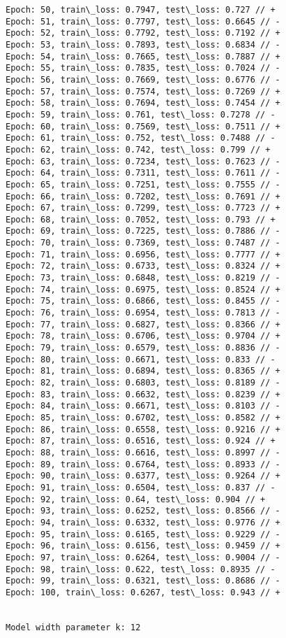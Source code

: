 \documentclass[11pt]{article}
\begin{document}
\begin{Verbatim}[commandchars=\\\{\}]
Epoch: 50, train\_loss: 0.7947, test\_loss: 0.727 // +
Epoch: 51, train\_loss: 0.7797, test\_loss: 0.6645 // -
Epoch: 52, train\_loss: 0.7792, test\_loss: 0.7192 // +
Epoch: 53, train\_loss: 0.7893, test\_loss: 0.6834 // -
Epoch: 54, train\_loss: 0.7665, test\_loss: 0.7887 // +
Epoch: 55, train\_loss: 0.7835, test\_loss: 0.7024 // -
Epoch: 56, train\_loss: 0.7669, test\_loss: 0.6776 // -
Epoch: 57, train\_loss: 0.7574, test\_loss: 0.7269 // +
Epoch: 58, train\_loss: 0.7694, test\_loss: 0.7454 // +
Epoch: 59, train\_loss: 0.761, test\_loss: 0.7278 // -
Epoch: 60, train\_loss: 0.7569, test\_loss: 0.7511 // +
Epoch: 61, train\_loss: 0.752, test\_loss: 0.7488 // -
Epoch: 62, train\_loss: 0.742, test\_loss: 0.799 // +
Epoch: 63, train\_loss: 0.7234, test\_loss: 0.7623 // -
Epoch: 64, train\_loss: 0.7311, test\_loss: 0.7611 // -
Epoch: 65, train\_loss: 0.7251, test\_loss: 0.7555 // -
Epoch: 66, train\_loss: 0.7202, test\_loss: 0.7691 // +
Epoch: 67, train\_loss: 0.7299, test\_loss: 0.7723 // +
Epoch: 68, train\_loss: 0.7052, test\_loss: 0.793 // +
Epoch: 69, train\_loss: 0.7225, test\_loss: 0.7886 // -
Epoch: 70, train\_loss: 0.7369, test\_loss: 0.7487 // -
Epoch: 71, train\_loss: 0.6956, test\_loss: 0.7777 // +
Epoch: 72, train\_loss: 0.6733, test\_loss: 0.8324 // +
Epoch: 73, train\_loss: 0.6848, test\_loss: 0.8219 // -
Epoch: 74, train\_loss: 0.6975, test\_loss: 0.8524 // +
Epoch: 75, train\_loss: 0.6866, test\_loss: 0.8455 // -
Epoch: 76, train\_loss: 0.6954, test\_loss: 0.7813 // -
Epoch: 77, train\_loss: 0.6827, test\_loss: 0.8366 // +
Epoch: 78, train\_loss: 0.6706, test\_loss: 0.9704 // +
Epoch: 79, train\_loss: 0.6579, test\_loss: 0.8836 // -
Epoch: 80, train\_loss: 0.6671, test\_loss: 0.833 // -
Epoch: 81, train\_loss: 0.6894, test\_loss: 0.8365 // +
Epoch: 82, train\_loss: 0.6803, test\_loss: 0.8189 // -
Epoch: 83, train\_loss: 0.6632, test\_loss: 0.8239 // +
Epoch: 84, train\_loss: 0.6671, test\_loss: 0.8103 // -
Epoch: 85, train\_loss: 0.6702, test\_loss: 0.8582 // +
Epoch: 86, train\_loss: 0.6558, test\_loss: 0.9216 // +
Epoch: 87, train\_loss: 0.6516, test\_loss: 0.924 // +
Epoch: 88, train\_loss: 0.6616, test\_loss: 0.8997 // -
Epoch: 89, train\_loss: 0.6764, test\_loss: 0.8933 // -
Epoch: 90, train\_loss: 0.6377, test\_loss: 0.9264 // +
Epoch: 91, train\_loss: 0.6504, test\_loss: 0.837 // -
Epoch: 92, train\_loss: 0.64, test\_loss: 0.904 // +
Epoch: 93, train\_loss: 0.6252, test\_loss: 0.8566 // -
Epoch: 94, train\_loss: 0.6332, test\_loss: 0.9776 // +
Epoch: 95, train\_loss: 0.6165, test\_loss: 0.9229 // -
Epoch: 96, train\_loss: 0.6156, test\_loss: 0.9459 // +
Epoch: 97, train\_loss: 0.6264, test\_loss: 0.9004 // -
Epoch: 98, train\_loss: 0.622, test\_loss: 0.8935 // -
Epoch: 99, train\_loss: 0.6321, test\_loss: 0.8686 // -
Epoch: 100, train\_loss: 0.6267, test\_loss: 0.943 // +


Model width parameter k: 12
    \end{Verbatim}
\end{document}
